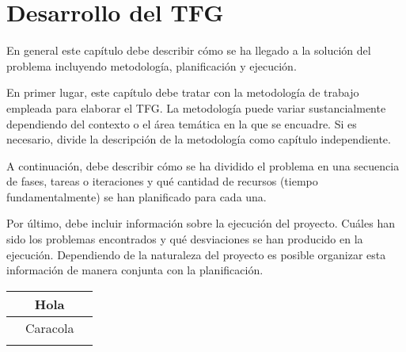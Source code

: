 \chapter{Desarrollo del TFG}
\label{ch:desarrollo}

\avisoLocalizacionArchivo 

En general este capítulo debe describir cómo se ha llegado a la solución del problema incluyendo metodología, planificación y ejecución.

En primer lugar, este capítulo debe tratar con la metodología de trabajo empleada para elaborar el TFG.  La metodología puede variar sustancialmente dependiendo del contexto o el área temática en la que se encuadre.  Si es necesario, divide la descripción de la metodología como capítulo independiente.

A continuación, debe describir cómo se ha dividido el problema en una secuencia de fases, tareas o iteraciones y qué cantidad de recursos (tiempo fundamentalmente) se han planificado para cada una.

Por último, debe incluir información sobre la ejecución del proyecto. Cuáles han sido los problemas encontrados y qué desviaciones se han producido en la ejecución.  Dependiendo de la naturaleza del proyecto es posible organizar esta información de manera conjunta con la planificación.

\begin{tabular}{|c|c|c|}
	\hline
	& Hola &  \\
	\hline
	& Caracola &  \\
	\hline
	&  &  \\
	\hline
\end{tabular}

